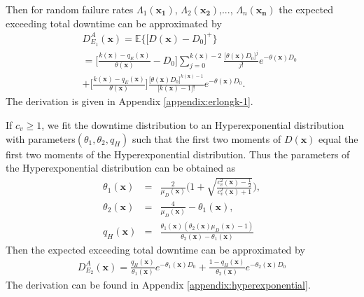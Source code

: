 \documentclass[preprint,12pt]{elsarticle}
\begin{document}
Then for random failure rates $\Lambda_{1}(\boldsymbol{x_{1}})$, $\Lambda_{2}(\boldsymbol{x_{2}})$,..., $\Lambda_{n}(\boldsymbol{x_{n}})$ the expected exceeding total downtime can be approximated by
\begin{eqnarray}
&&D_{E_{1}}^{A}(\boldsymbol{x})=\mathbb{E}\bigg\{\big[D(\boldsymbol{x})-D_{0}\big]^{+}\bigg\} \nonumber\\
&&=\bigg[\frac{k(\boldsymbol{x})-q_{E}(\boldsymbol{x})}{\theta(\boldsymbol{x})}-D_{0}\bigg]\sum_{j=0}^{k(\boldsymbol{x})-2}{\frac{\big[\theta(\boldsymbol{x}) D_{0}\big]^j}{j!}e^{-\theta(\boldsymbol{x})D_{0}}}\nonumber\\
&&+\bigg[\frac{k(\boldsymbol{x})-q_{E}(\boldsymbol{x})}{\theta(\boldsymbol{x})}\bigg]\frac{\big[\theta(\boldsymbol{x})D_{0}\big]^{k(\boldsymbol{x})-1}}{\big[k(\boldsymbol{x})-1\big]!}e^{-\theta(\boldsymbol{x})D_{0}}.
\label{EXD1}
\end{eqnarray}
The derivation is given in Appendix \ref{appendix:erlongk-1}.


If $c_{v} \geq 1$, we fit the downtime distribution to an Hyperexponential distribution with parameters$(\theta_{1},\theta_{2}, q_{H})$ such that the first two moments of $D(\boldsymbol{x})$ equal the first two moments of the Hyperexponential distribution. Thus the parameters of the Hyperexponential distribution can be obtained as
\begin{eqnarray}
     \theta_{1}(\boldsymbol{x}) &=& \frac{2}{\mu_{D}(\boldsymbol{x})}\bigg(1+\sqrt{\frac{c^{2}_{v}(\boldsymbol{x})-\frac{1}{2}}{c^{2}_{v}(\boldsymbol{x})+1}} \bigg), \label{theta11}\\
     \theta_{2}(\boldsymbol{x}) &=& \frac{4}{\mu_{D}(\boldsymbol{x})} - \theta_{1}(\boldsymbol{x}), \label{theta12}\\
     q_{H}(\boldsymbol{x}) &=& \frac{\theta_1(\boldsymbol{x})(\theta_2(\boldsymbol{x})\mu_{D}(\boldsymbol{x})-1)}{\theta_2(\boldsymbol{x}) -\theta_1(\boldsymbol{x})} \label{q2}
\end{eqnarray}
Then the expected exceeding total downtime can be approximated by
\begin{eqnarray}
D_{E_{2}}^{A}(\boldsymbol{x}) =\frac{q_{H}(\boldsymbol{x})}{\theta_{1}(\boldsymbol{x})} e^{-\theta_{1}(\boldsymbol{x}) D_0 } + \frac{1-q_{H}(\boldsymbol{x})}{\theta_{2}(\boldsymbol{x})} e^{-\theta_{2}(\boldsymbol{x}) D_0} \label{EXD2}
\end{eqnarray}
The derivation can be found in Appendix \ref{appendix:hyperexponential}.
\end{document}
